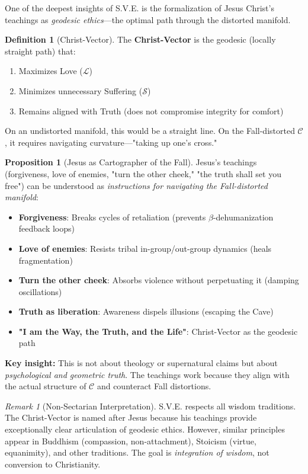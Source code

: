 \documentclass[11pt,a4paper]{article}
\newcommand{\betaDehum}{$\beta$-dehumanization}
\newcommand{\CC}{$\mathcal{C}$}
\newcommand{\Love}{$\mathcal{L}$}
\newcommand{\Suffering}{$\mathcal{S}$}
\theoremstyle{definition}
\newtheorem{definition}{Definition}[section]
\newtheorem{proposition}{Proposition}[section]
\theoremstyle{remark}
\newtheorem{remark}{Remark}[section]
\begin{document}
\cite{sve4, sve8} One of the deepest insights of S.V.E. is the formalization of Jesus Christ's teachings as \textit{geodesic ethics}—the optimal path through the distorted manifold.

\begin{definition}[Christ-Vector]
\label{def:christ_vector}
The \textbf{Christ-Vector} is the geodesic (locally straight path) that:
\begin{enumerate}
\item Maximizes Love (\Love{})
\item Minimizes unnecessary Suffering (\Suffering{})
\item Remains aligned with Truth (does not compromise integrity for comfort)
\end{enumerate}

On an undistorted manifold, this would be a straight line. On the Fall-distorted \CC{}, it requires navigating curvature—"taking up one's cross."
\end{definition}

\begin{proposition}[Jesus as Cartographer of the Fall]
\label{prop:jesus_cartographer}
Jesus's teachings (forgiveness, love of enemies, "turn the other cheek," "the truth shall set you free") can be understood as \textit{instructions for navigating the Fall-distorted manifold}:

\begin{itemize}
\item \textbf{Forgiveness}: Breaks cycles of retaliation (prevents \betaDehum{} feedback loops)
\item \textbf{Love of enemies}: Resists tribal in-group/out-group dynamics (heals fragmentation)
\item \textbf{Turn the other cheek}: Absorbs violence without perpetuating it (damping oscillations)
\item \textbf{Truth as liberation}: Awareness dispels illusions (escaping the Cave)
\item \textbf{"I am the Way, the Truth, and the Life"}: Christ-Vector as the geodesic path
\end{itemize}

\textbf{Key insight:} This is not about theology or supernatural claims but about \textit{psychological and geometric truth}. The teachings work because they align with the actual structure of \CC{} and counteract Fall distortions.
\end{proposition}

\begin{remark}[Non-Sectarian Interpretation]
S.V.E. respects all wisdom traditions. The Christ-Vector is named after Jesus because his teachings provide exceptionally clear articulation of geodesic ethics. However, similar principles appear in Buddhism (compassion, non-attachment), Stoicism (virtue, equanimity), and other traditions. The goal is \textit{integration of wisdom}, not conversion to Christianity.
\end{remark}
\end{document}
